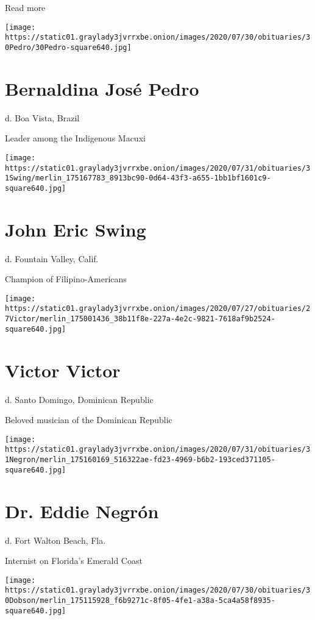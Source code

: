 Read more

\texttt{[image: https://static01.graylady3jvrrxbe.onion/images/2020/07/30/obituaries/30Pedro/30Pedro-square640.jpg]}

\hypertarget{bernaldina-josuxe9-pedro}{%
\section{Bernaldina José Pedro}\label{bernaldina-josuxe9-pedro}}

d. Boa Vista, Brazil

Leader among the Indigenous Macuxi

\texttt{[image: https://static01.graylady3jvrrxbe.onion/images/2020/07/31/obituaries/31Swing/merlin\_175167783\_8913bc90-0d64-43f3-a655-1bb1bf1601c9-square640.jpg]}

\hypertarget{john-eric-swing}{%
\section{John Eric Swing}\label{john-eric-swing}}

d. Fountain Valley, Calif.

Champion of Filipino-Americans

\texttt{[image: https://static01.graylady3jvrrxbe.onion/images/2020/07/27/obituaries/27Victor/merlin\_175001436\_38b11f8e-227a-4e2c-9821-7618af9b2524-square640.jpg]}

\hypertarget{victor-victor}{%
\section{Victor Victor}\label{victor-victor}}

d. Santo Domingo, Dominican Republic

Beloved musician of the Dominican Republic

\texttt{[image: https://static01.graylady3jvrrxbe.onion/images/2020/07/31/obituaries/31Negron/merlin\_175160169\_516322ae-fd23-4969-b6b2-193ced371105-square640.jpg]}

\hypertarget{dr-eddie-negruxf3n}{%
\section{Dr. Eddie Negrón}\label{dr-eddie-negruxf3n}}

d. Fort Walton Beach, Fla.

Internist on Florida's Emerald Coast

\texttt{[image: https://static01.graylady3jvrrxbe.onion/images/2020/07/30/obituaries/30Dobson/merlin\_175115928\_f6b9271c-8f05-4fe1-a38a-5ca4a58f8935-square640.jpg]}

